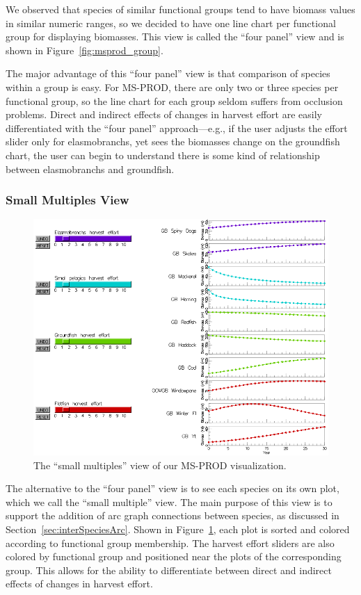 We observed that species of similar functional groups tend to have biomass values in similar numeric ranges, so we decided to have one line chart per functional group for displaying biomasses.  This view is called the ``four panel'' view and is shown in Figure~\ref{fig:msprod_group}.

The major advantage of this ``four panel'' view is that comparison of species within a group is easy.  For MS-PROD, there are only two or three species per functional group, so the line chart for each group seldom suffers from occlusion problems.  Direct and indirect effects of changes in harvest effort are easily differentiated with the ``four panel'' approach---e.g., if the user adjusts the effort slider only for elasmobranchs, yet sees the biomasses change on the groundfish chart, the user can begin to understand there is some kind of relationship between elasmobranchs and groundfish.

\subsubsection{Small Multiples View}

\begin{figure}[t]
	\centering
	\includegraphics[width=12cm]{figures/png/msprod_species.png}
	\caption[The ``small multiples'' view of our MS-PROD visualization]{The ``small multiples'' view of our MS-PROD visualization.}
	\label{fig:msprod_species}
\end{figure}

The alternative to the ``four panel'' view is to see each species on its own plot, which we call the ``small multiple'' view.  The main purpose of this view is to support the addition of arc graph connections between species, as discussed in Section~\ref{sec:interSpeciesArc}. Shown in Figure~\ref{fig:msprod_species}, each plot is sorted and colored according to functional group membership.  The harvest effort sliders are also colored by functional group and positioned near the plots of the corresponding group.  This allows for the ability to differentiate between direct and indirect effects of changes in harvest effort.

